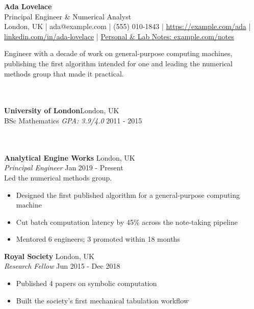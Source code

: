 \documentclass[letterpaper,11pt]{article}
\newcommand{\header} [1] {
    \vspace{3pt}
    \noindent{\large \bfseries #1}\\
    \noindent\hrulefill\\
}
\begin{document}
      \begin{center}
        {\Large \bfseries Ada Lovelace}\\
  Principal Engineer \& Numerical Analyst\\
  London, UK | ada@example.com | (555) 010-1843 | \href{https://example.com/ada}{https://example.\allowbreak{}com/\allowbreak{}ada} | \href{https://linkedin.com/in/ada-lovelace}{linkedin.\allowbreak{}com/\allowbreak{}in/\allowbreak{}ada-\allowbreak{}lovelace} | \href{https://example.com/notes}{Personal \& Lab Notes: example.\allowbreak{}com/\allowbreak{}notes}
      \end{center}
      \vspace{4pt}
Engineer with a decade of work on general-purpose computing machines, publishing the first algorithm intended for one and leading the numerical methods group that made it practical.

      \header{Education}
      \textbf{University of London}\hfill London, UK\\
BSc Mathematics \textit{GPA: 3.9/4.0} \hfill 2011 - 2015\\
\vspace{2mm}

      \header{Experience}

      \textbf{Analytical Engine Works} \hfill London, UK\\
          \textit{Principal Engineer} \hfill Jan 2019 - Present\\
          Led the numerical methods group.\\
          \begin{itemize} \itemsep 2pt
  \item Designed the first published algorithm for a general-purpose computing machine
  \item Cut batch computation latency by 45\% across the note-taking pipeline
  \item Mentored 6 engineers; 3 promoted within 18 months
\end{itemize}
      \textbf{Royal Society} \hfill London, UK\\
          \textit{Research Fellow} \hfill Jun 2015 - Dec 2018\\
          
          \begin{itemize} \itemsep 2pt
  \item Published 4 papers on symbolic computation
  \item Built the society's first mechanical tabulation workflow
\end{itemize}
\end{document}
